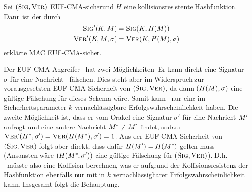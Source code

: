 \begin{theorem} Sei $(\textsc{Sig}, \textsc{Ver})$ EUF-CMA-sicher\indexEUFCMA und $H$
  eine kollisionsresistente Hashfunktion. Dann ist der durch
  \begin{align*} \textsc{Sig}'(K,M) &= \textsc{Sig}(K,H(M))\\ \textsc{Ver}'(K,M,\sigma) &=
                                                                  \textsc{Ver}(K,H(M),\sigma)
  \end{align*} erklärte MAC EUF-CMA-sicher.~\\
\end{theorem}

\begin{beweisidee}
  \label{ch:symauth:eufcma-beweis} Der EUF-CMA-Angreifer \A~hat zwei
  Möglichkeiten. Er kann direkt eine Signatur $\sigma$ für eine Nachricht
  \plaint~fälschen. Dies steht aber im Widerspruch zur vorausgesetzten
  EUF-CMA-Sicherheit von $(\textsc{Sig}, \textsc{Ver})$, da dann $(H(M), \sigma)$
  eine gültige Fälschung für dieses Schema wäre. Somit kann \A~nur eine im
  Sicherheitsparameter $k$ vernachlässigbare Erfolgswahrscheinlichkeit
  haben. Die zweite Möglichkeit ist, dass er vom Orakel eine Signatur
  $\sigma'$ für eine Nachricht $M'$ anfragt und eine andere
  Nachricht $M^* \neq M'$ findet, sodass $\textsc{Ver}'(H^*, \sigma')
  = \textsc{Ver}(H(M^*), \sigma') = 1$. Aus der EUF-CMA-Sicherheit von
  $(\textsc{Sig},\textsc{Ver})$ folgt aber direkt, dass dafür $H(M') = H(M^*)$
  gelten muss (Ansonsten wäre $(H(M^*, \sigma'))$ eine gültige
  Fälschung für $(\textsc{Sig}, \textsc{Ver})$). D.h. \A~müsste also eine Kollision
  berechnen, was er aufgrund der Kollisionsresistenz der Hashfunktion
  ebenfalls nur mit in $k$ vernachlässigbarer Erfolgswahrscheinlichkeit
  kann. Insgesamt folgt die Behauptung.
\end{beweisidee}

